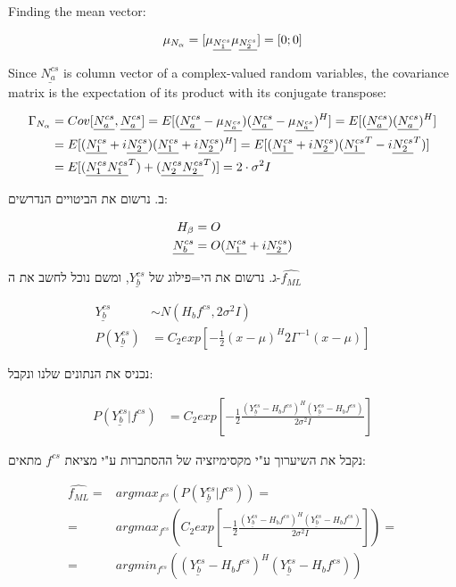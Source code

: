 \documentclass[a4paper]{iacas}
\begin{document}
Finding the mean vector:

\begin{align*}
\mu_{N_{\alpha}} = [\mu_{\underline{N_1^{cs}}}  \mu_{\underline{N_2^{cs}}} ] = [ 0 ; 0 ] 
\end{align*}

Since $\underline{N_a^{cs}}$ is column vector of a complex-valued random variables, the covariance matrix is the expectation of its product with its conjugate transpose:


\begin{align*}
\Gamma_{N_{\alpha}} &= Cov[\underline{N_a^{cs}} ,\underline{N_a^{cs}}] = E[(\underline{N_a^{cs}} - \mu_{\underline{N_a^{cs}}})(\underline{N_a^{cs}} - \mu_{\underline{N_a^{cs}}})^H] = E[(\underline{N_a^{cs}})(\underline{N_a^{cs}})^H] \\ 
&= E[(\underline{N_1^{cs}} + i\underline{N_2^{cs}})(\underline{N_1^{cs}} + i\underline{N_2^{cs}})^H]  =  E[(\underline{N_1^{cs}} + i\underline{N_2^{cs}})(\underline{N_1^{cs}}^{T} - i\underline{N_2^{cs}}^{T})]   \\ 
&= E[(\underline{N_1^{cs}}\underline{N_1^{cs}}^{T}) +(\underline{N_2^{cs}}\underline{N_2^{cs}}^{T})]= 2\cdot\sigma^{2}I
\end{align*}


\begin{hebrew}

ב. נרשום את הביטויים הנדרשים:
\end{hebrew}

\newcommand{\NBcs}{\underline{N_b^{cs}}}
\newcommand{\YBcs}{\underline{Y_b^{cs}}}

\begin{align*}
H_\beta &= O \\
\NBcs &= O(\Nrcs + i\Nics)
\end{align*}


\newcommand{\fml}{\hat{f_{ML}}}
\newcommand{\fcs}{f^{cs}}
\newcommand{\meanvec}{H_{b}\fcs}
\newcommand{\Hb}{H_{b}}
\begin{hebrew}
ג. נרשום את הי=פילוג של $\YBcs$, ומשם נוכל לחשב את ה-$\fml$
\end{hebrew}
\begin{align*}
\YBcs &\sim N(H_{b}\fcs, 2\sigma^{2}I) \\
P(\YBcs) &= C_{2}exp\left[-\frac{1}{2}(x-\mu)^{H}2\Gamma^{-1}(x-\mu)\right]
\end{align*}
\begin{hebrew}
נכניס את הנתונים שלנו ונקבל:
\end{hebrew}
\begin{align*}
P(\YBcs|\fcs) &= C_{2}exp\left[-\frac{1}{2}\frac{(\YBcs-\meanvec)^{H}(\YBcs-\meanvec)}{2\sigma^{2}I}\right]
\end{align*}

\begin{hebrew}
נקבל את השיערוך ע"י מקסימיזציה של ההסתברות ע"י מציאת $\fcs$ מתאים:
\end{hebrew}
\begin{align*}
\fml =& argmax_{\fcs}\left(P(\YBcs|\fcs)\right) = \\
=& argmax_{\fcs}\left(C_{2}exp\left[-\frac{1}{2}\frac{(\YBcs-\meanvec)^{H}(\YBcs-\meanvec)}{2\sigma^{2}I}\right]\right) = \\
=& argmin_{\fcs}\left((\YBcs-\meanvec)^{H}(\YBcs-\meanvec)\right) 
\end{align*}
\end{document}
